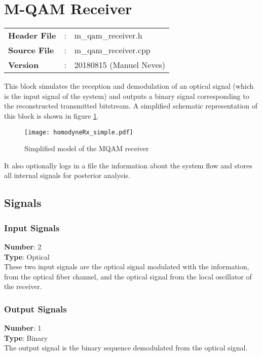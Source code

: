 \clearpage
\graphicspath{{./lib/m_qam_receiver/figures/}}
\section{M-QAM Receiver}\label{lib:homodyneRx}

\begin{tcolorbox}	
	\begin{tabular}{p{2.75cm} p{0.2cm} p{10.5cm}} 	
		\textbf{Header File}   &:& m\_qam\_receiver.h \\
		\textbf{Source File}   &:& m\_qam\_receiver.cpp \\
        \textbf{Version}       &:& 20180815 (Manuel Neves)\\
	\end{tabular}
\end{tcolorbox}

This block simulates the reception and demodulation of an optical
signal (which is the input signal of the system) and outputs a binary signal
corresponding to the reconstructed transmitted bitstream.
 A simplified schematic representation of this block is shown in
figure
\ref{fig:homodyneRx_simple}.

\begin{figure}[h]
	\centering
	\texttt{[image: homodyneRx\_simple.pdf]}
	\caption{Simplified model of the MQAM
	receiver}\label{fig:homodyneRx_simple}
\end{figure}
It also optionally logs in a file the information about the system flow and stores all internal signals for posterior analysis.

\subsection*{Signals}

\subsubsection*{Input Signals}
\hspace*{0.5in}\textbf{Number}: 2\\
\hspace*{0.5in}\textbf{Type}: Optical
\\
These two input signals are the optical signal modulated with the information, from the optical fiber channel, and the optical signal from the local oscillator of the receiver.

\subsubsection*{Output Signals}
\hspace*{0.5in}\textbf{Number}: 1\\
\hspace*{0.5in}\textbf{Type}: Binary
\\
The output signal is the binary sequence demodulated from the optical signal.



